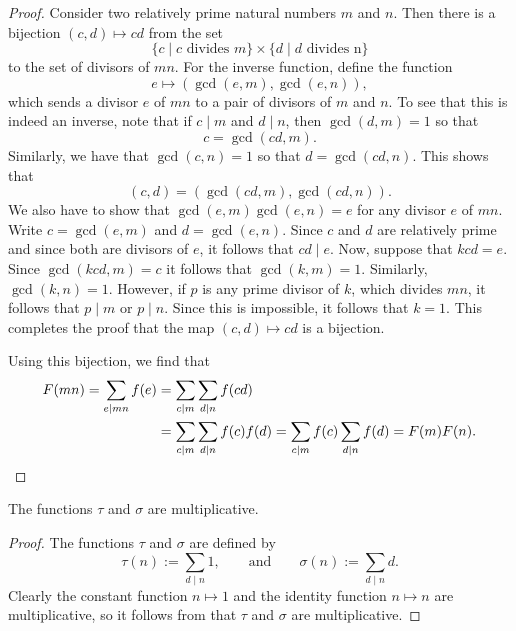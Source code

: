 \begin{proof}
  Consider two relatively prime natural numbers $m$ and $n$. Then there is a bijection $(c,d)\mapsto cd$ from the set
  \begin{equation*}
    \{c\mid c\text{ divides }m\}\times\{d\mid d\text{ divides n}\}
  \end{equation*}
  to the set of divisors of $mn$. For the inverse function, define the function
  \begin{equation*}
    e\mapsto (\gcd(e,m),\gcd(e,n)),
  \end{equation*}
  which sends a divisor $e$ of $mn$ to a pair of divisors of $m$ and $n$. To see that this is indeed an inverse, note that if $c\mid m$ and $d\mid n$, then $\gcd(d,m)=1$ so that
  \begin{equation*}
    c=\gcd(cd,m).
  \end{equation*}
  Similarly, we have that $\gcd(c,n)=1$ so that $d=\gcd(cd,n)$. This shows that
  \begin{equation*}
    (c,d)=(\gcd(cd,m),\gcd(cd,n)).
  \end{equation*}
  We also have to show that $\gcd(e,m)\gcd(e,n)=e$ for any divisor $e$ of $mn$. Write $c=\gcd(e,m)$ and $d=\gcd(e,n)$. Since $c$ and $d$ are relatively prime and since both are divisors of $e$, it follows that $cd\mid e$. Now, suppose that $kcd=e$. Since $\gcd(kcd,m)=c$ it follows that $\gcd(k,m)=1$. Similarly, $\gcd(k,n)=1$. However, if $p$ is any prime divisor of $k$, which divides $mn$, it follows that $p\mid m$ or $p\mid n$. Since this is impossible, it follows that $k=1$. This completes the proof that the map $(c,d)\mapsto cd$ is a bijection.

  Using this bijection, we find that
  \begin{align*}
    F(mn)=\sum_{e\mid mn}f(e) & =\sum_{c\mid m}\sum_{d\mid n}f(cd) \\
    & =\sum_{c\mid m}\sum_{d\mid n}f(c)f(d) = \sum_{c\mid m}f(c)\sum_{d\mid n}f(d) = F(m)F(n).\qedhere
  \end{align*}
\end{proof}

\begin{theorem}
  The functions $\tau$ and $\sigma$ are multiplicative.
\end{theorem}

\begin{proof}
  The functions $\tau$ and $\sigma$ are defined by
  \begin{equation*}
    \tau(n):= \sum_{d\mid n}1,\qquad\text{and}\qquad\sigma(n):=\sum_{d\mid n}d.
  \end{equation*}
  Clearly the constant function $n\mapsto 1$ and the identity function $n\mapsto n$ are multiplicative, so it follows from  that $\tau$ and $\sigma$ are multiplicative.
\end{proof}

